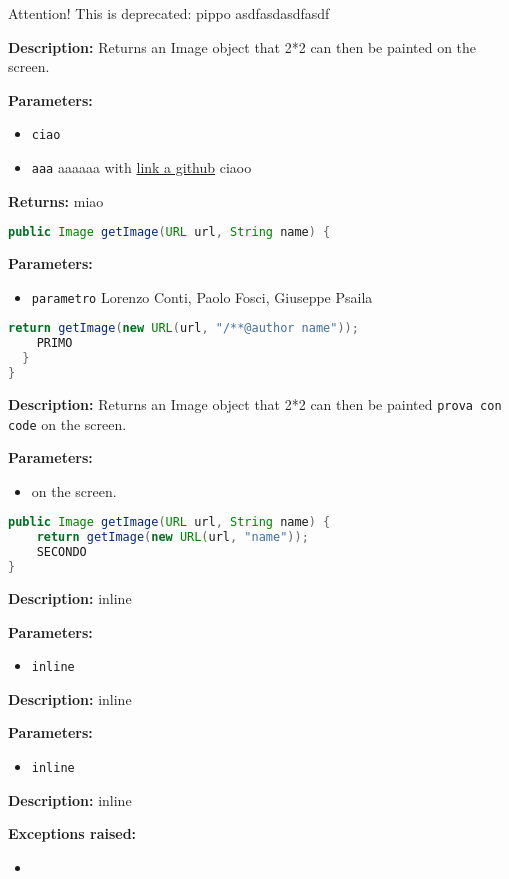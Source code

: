 Attention! This is deprecated: pippo asdfasdasdfasdf

\textbf{Description:}
Returns an Image object that 2*2 can then be painted on the screen.

\textbf{Parameters:}
\begin{itemize}
  \item\texttt{ciao} 
  \item\texttt{aaa} aaaaaa with \href{https://github.com/test}{link a github}  ciaoo
\end{itemize}

\textbf{Returns:}
miao

\begin{lstlisting}[language=Java]
public Image getImage(URL url, String name) {
\end{lstlisting}
\textbf{Parameters:}
\begin{itemize}
  \item\texttt{parametro} Lorenzo Conti, Paolo Fosci, Giuseppe Psaila
\end{itemize}

\begin{lstlisting}[language=Java]
    return getImage(new URL(url, "/**@author name"));
    PRIMO
  }
}
\end{lstlisting}
\textbf{Description:}
Returns an Image object that 2*2 can then be painted \texttt{prova con code} on the screen.

\textbf{Parameters:}
\begin{itemize}
  \item\texttt{} on the screen.
\end{itemize}

\begin{lstlisting}[language=Java]
public Image getImage(URL url, String name) {
    return getImage(new URL(url, "name"));
    SECONDO
}
\end{lstlisting}
\textbf{Description:}
inline

\textbf{Parameters:}
\begin{itemize}
  \item\texttt{inline} 
\end{itemize}

\textbf{Description:}
inline

\textbf{Parameters:}
\begin{itemize}
  \item\texttt{inline} 
\end{itemize}

\textbf{Description:}
inline

\textbf{Exceptions raised:}
\begin{itemize}
  \item\texttt{} 
\end{itemize}

